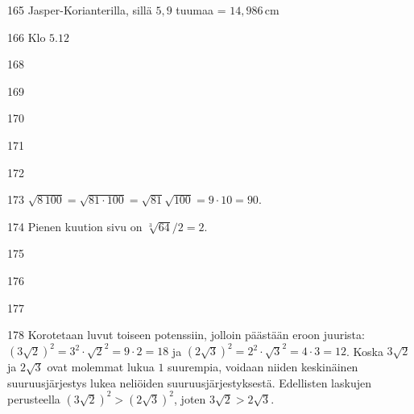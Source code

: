 \begin{Vastaus}{165}
Jasper-Korianterilla, sillä $5,9$ tuumaa = $14,986$\,cm
	
\end{Vastaus}
\begin{Vastaus}{166}
Klo $5.12$
	
\end{Vastaus}
\begin{Vastaus}{168}
	
\end{Vastaus}
\begin{Vastaus}{169}
	
\end{Vastaus}
\begin{Vastaus}{170}
	
\end{Vastaus}
\begin{Vastaus}{171}
	
\end{Vastaus}
\begin{Vastaus}{172}
	
\end{Vastaus}
\begin{Vastaus}{173}
$\sqrt{8\,100}=\sqrt{81\cdot100}=\sqrt{81}\sqrt{100}=9\cdot 10=90$.
	
\end{Vastaus}
\begin{Vastaus}{174}
Pienen kuution sivu on $\sqrt[3]{64}/2=2$.
	
\end{Vastaus}
\begin{Vastaus}{175}
	
\end{Vastaus}
\begin{Vastaus}{176}
	
\end{Vastaus}
\begin{Vastaus}{177}
	
\end{Vastaus}
\begin{Vastaus}{178}
Korotetaan luvut toiseen potenssiin, jolloin päästään eroon juurista: $(3\sqrt{2})^2=3^2\cdot\sqrt{2}^2=9 \cdot 2=18$ ja $(2\sqrt{3})^2=2^2\cdot\sqrt{3}^2=4 \cdot 3=12$. Koska $3\sqrt{2}$ ja $2\sqrt{3}$ ovat molemmat lukua $1$ suurempia, voidaan niiden keskinäinen suuruusjärjestys lukea neliöiden suuruusjärjestyksestä. Edellisten laskujen perusteella $(3\sqrt{2})^2 > (2\sqrt{3})^2$, joten $3\sqrt{2} > 2\sqrt{3}$.
        
\end{Vastaus}
